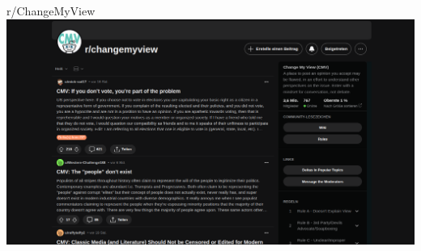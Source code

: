 \documentclass[compress,12pt]{beamer}
\begin{document}
    \begin{frame}{r/ChangeMyView}
        \includegraphics[width=\textwidth]{../images/cmv-example-main-page}
    \end{frame}
\end{document}
